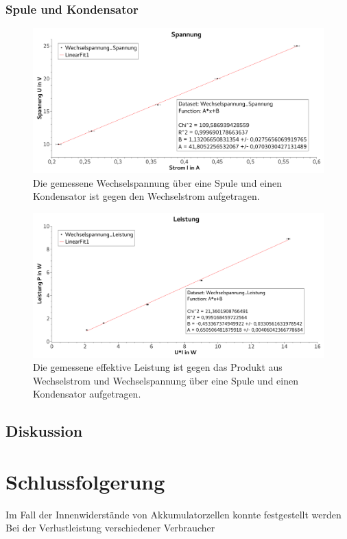 \documentclass[
	a4paper,
	12pt,
	pagesize,
	ngerman
]{scrartcl}
\begin{document}
	\subsubsection*{Spule und Kondensator}
	
	\begin{figure}[tb]
		\includegraphics[width=1\textwidth]{KondensatorSpannungWechsel}
		\centering
		\caption{Die gemessene Wechselspannung über eine Spule und einen Kondensator ist gegen den Wechselstrom aufgetragen.}
		\label{KondesatorSpannungWechsel}
		\centering
	\end{figure}
	\begin{figure}[tb]
		\includegraphics[width=1\textwidth]{KondensatorLeistungWechsel}
		\centering
		\caption{Die gemessene effektive Leistung ist gegen das Produkt aus Wechselstrom und Wechselspannung über eine Spule und einen Kondensator aufgetragen.}
		\label{KondesatorLeistungWechsel}
		\centering
	\end{figure}
	



	




	\subsection{Diskussion}
	
	\section{Schlussfolgerung}
	Im Fall der Innenwiderstände von Akkumulatorzellen konnte festgestellt werden
	Bei der Verlustleistung verschiedener Verbraucher 
\end{document}
